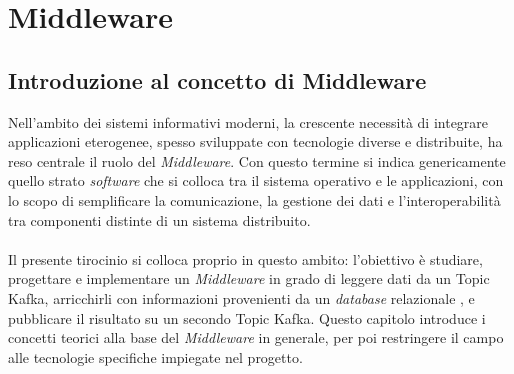 \chapter{Middleware}
\label{Middleware}

\section{Introduzione al concetto di Middleware}
Nell'ambito dei sistemi informativi moderni, la crescente necessità di integrare applicazioni eterogenee, spesso sviluppate con tecnologie diverse e distribuite, ha reso centrale il ruolo del \textit{Middleware}. Con questo termine si indica genericamente quello strato \textit{software} che si colloca tra il sistema operativo e le applicazioni, con lo scopo di semplificare la comunicazione, la gestione dei dati e l'interoperabilità tra componenti distinte di un sistema distribuito. \\ \\
Il presente tirocinio si colloca proprio in questo ambito: l'obiettivo è studiare, progettare e implementare un \textit{Middleware} in grado di leggere dati da un \gls{Topic Kafka}, arricchirli con informazioni provenienti da un \textit{database} relazionale , e pubblicare il risultato su un secondo \gls{Topic Kafka}. Questo capitolo introduce i concetti teorici alla base del \textit{Middleware} in generale, per poi restringere il campo alle tecnologie specifiche impiegate nel progetto.

